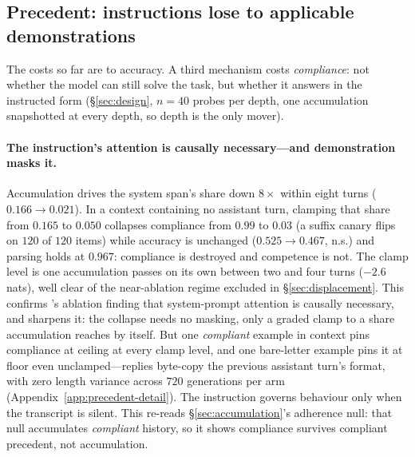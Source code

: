 \documentclass{article}
\begin{document}
\subsection{Precedent: instructions lose to applicable demonstrations}
\label{sec:precedent}

The costs so far are to accuracy. A third mechanism costs \emph{compliance}: not whether the
model can still solve the task, but whether it answers in the instructed form
(\S\ref{sec:design}, $n{=}40$ probes per depth, one accumulation snapshotted at every depth, so
depth is the only mover).

\paragraph{The instruction's attention is causally necessary---and demonstration masks it.}
Accumulation drives the system span's share down $8\times$ within eight turns
($0.166\to0.021$). In a context containing no assistant turn, clamping that share from $0.165$
to $0.050$ collapses compliance from $0.99$ to $0.03$ (a suffix canary flips on $120$ of $120$
items) while accuracy is unchanged ($0.525\to0.467$, n.s.) and parsing holds at $0.967$:
compliance is destroyed and competence is not. The clamp level is one accumulation passes on
its own between two and four turns ($-2.6$ nats), well clear of the near-ablation regime
excluded in \S\ref{sec:displacement}. This confirms \citet{dongre2026attentioncloses}'s
ablation finding that system-prompt attention is causally necessary, and sharpens it: the
collapse needs no masking, only a graded clamp to a share accumulation reaches by itself. But
one \emph{compliant} example in context pins compliance at ceiling at every clamp level, and one
bare-letter example pins it at floor even unclamped---replies byte-copy the previous assistant
turn's format, with zero length variance across $720$ generations per arm
(Appendix~\ref{app:precedent-detail}). The instruction governs behaviour only when the
transcript is silent. This re-reads \S\ref{sec:accumulation}'s adherence null: that null
accumulates \emph{compliant} history, so it shows compliance survives compliant precedent, not
accumulation.
\end{document}
